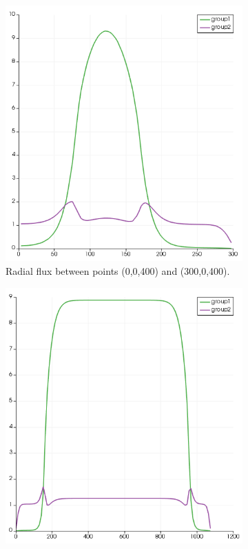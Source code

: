 \documentclass[11pt,letterpaper]{article}
\begin{document}
	\begin{figure}[htbp!]
		\centering
		\begin{subfigure}[t]{0.4\textwidth}
			\centering
			\includegraphics[width=\linewidth]{3D-fullcore-120-homoC1}
			\caption{Radial flux between points (0,0,400) and (300,0,400).}
		\end{subfigure}
		\begin{subfigure}[t]{0.4\textwidth}
			\centering
			\includegraphics[width=\linewidth]{3D-fullcore-120-homoC2}

\end{subfigure}
\end{figure}
\end{document}
